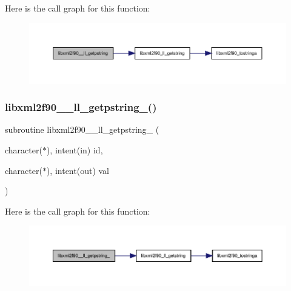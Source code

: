 Here is the call graph for this function\+:
\nopagebreak
\begin{figure}[H]
\begin{center}
\leavevmode
\includegraphics[width=350pt]{libxml2f90_8f90__pp_8f90_a956943680a07e3d0179b205f6209d9cb_cgraph}
\end{center}
\end{figure}
\mbox{\label{libxml2f90_8f90__pp_8f90_ae6434bdc3ab4de456efd90e496483891}} 
\subsubsection{\texorpdfstring{libxml2f90\+\_\+\+\_\+ll\+\_\+getpstring\+\_\+()}{libxml2f90\_\_ll\_getpstring\_()}}
{\footnotesize\ttfamily subroutine libxml2f90\+\_\+\+\_\+ll\+\_\+getpstring\+\_\+ (\begin{DoxyParamCaption}\item[{character($\ast$), intent(in)}]{id,  }\item[{character($\ast$), intent(out)}]{val }\end{DoxyParamCaption})}

Here is the call graph for this function\+:
\nopagebreak
\begin{figure}[H]
\begin{center}
\leavevmode
\includegraphics[width=350pt]{libxml2f90_8f90__pp_8f90_ae6434bdc3ab4de456efd90e496483891_cgraph}
\end{center}
\end{figure}
\mbox{\label{libxml2f90_8f90__pp_8f90_a8f48610de931b9ef342dadfd11a62da0}} 
